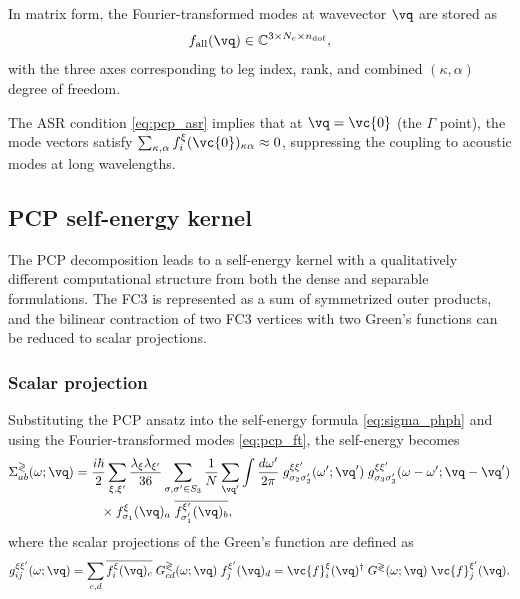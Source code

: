 In matrix form, the Fourier-transformed modes at wavevector $\vq$ are
stored as
\begin{equation}
  f_\mathrm{all}(\vq) \in \mathbb{C}^{3 \times N_c \times n_\mathrm{dof}},
\end{equation}
with the three axes corresponding to leg index, rank, and combined
$(\kappa, \alpha)$ degree of freedom.

The ASR condition \cref{eq:pcp_asr} implies that at $\vq = \vc{0}$
(the $\Gamma$ point), the mode vectors satisfy
$\sum_{\kappa,\alpha} f_i^{\xi}(\vc{0})_{\kappa\alpha} \approx 0$,
suppressing the coupling to acoustic modes at long wavelengths.


\subsection{PCP self-energy kernel}
\label{sub:pcp_self_energy}

The PCP decomposition leads to a self-energy kernel with a qualitatively
different computational structure from both the dense and separable
formulations.  The FC3 is represented as a sum of symmetrized outer products,
and the bilinear contraction of two FC3 vertices with two Green's functions
can be reduced to scalar projections.

\subsubsection{Scalar projection}
\label{sssub:pcp_scalar_projection}

Substituting the PCP ansatz into the self-energy formula
\cref{eq:sigma_phph} and using the Fourier-transformed modes
\cref{eq:pcp_ft}, the self-energy becomes
\begin{align}\label{eq:sigma_pcp}
  \Sigma^{\gtrless}_{ab}(\omega; \vq)
  &= \frac{i\hbar}{2}
    \sum_{\xi,\xi'} \frac{\lambda_\xi \lambda_{\xi'}}{36}
    \sum_{\sigma,\sigma' \in S_3}
    \frac{1}{N} \sum_{\vq'}
    \int \frac{d\omega'}{2\pi}\;
    g_{\sigma_2 \sigma_2'}^{\xi \xi'}(\omega'; \vq')\;
    g_{\sigma_3 \sigma_3'}^{\xi \xi'}(\omega - \omega'; \vq - \vq')
    \notag\\
  &\qquad \times
    f_{\sigma_1}^{\xi}(\vq)_a \;
    \overline{f_{\sigma_1'}^{\xi'}(\vq)_b},
\end{align}
where the scalar projections of the Green's function are defined
as
\begin{equation}\label{eq:scalar_proj}
  g_{ij}^{\xi\xi'}(\omega; \vq)
  = \sum_{c,d}
    \overline{f_i^{\xi}(\vq)_c}\;
    G^{\gtrless}_{cd}(\omega; \vq)\;
    f_j^{\xi'}(\vq)_d
  = \vc{f}_i^{\xi}(\vq)^\dagger\;
    G^{\gtrless}(\omega; \vq)\;
    \vc{f}_j^{\xi'}(\vq).
\end{equation}

